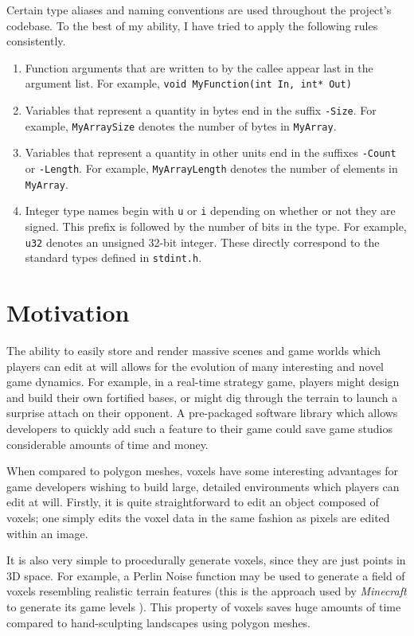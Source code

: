 Certain type aliases and naming conventions are used throughout the project's codebase. To the best of my ability, I have tried to apply the following rules consistently.
\begin{enumerate}
    \item Function arguments that are written to by the callee appear last in the  argument list. For example, \texttt{void MyFunction(int In, int* Out)}
    
    \item Variables that represent a quantity in bytes end in the suffix \texttt{-Size}. For example, \texttt{MyArraySize} denotes the number of bytes in \texttt{MyArray}.
    
    \item Variables that represent a quantity in other units end in the suffixes \texttt{-Count} or \texttt{-Length}. For example, \texttt{MyArrayLength} denotes the number of elements in \texttt{MyArray}.
    
    \item Integer type names begin with \texttt{u} or \texttt{i} depending on whether or not they are signed. This prefix is followed by the number of bits in the type. For example, \texttt{u32} denotes an unsigned 32-bit integer. These directly correspond to the standard types defined in \texttt{stdint.h}.
\end{enumerate}

\section{Motivation}
The ability to easily store and render massive scenes and game worlds which players can edit at will allows for the evolution of many interesting and novel game dynamics. For example, in a real-time strategy game, players might design and build their own fortified bases, or might dig through the terrain to launch a surprise attach on their opponent. A pre-packaged software library which allows developers to quickly add such a feature to their game could save game studios considerable amounts of time and money.

When compared to polygon meshes, voxels have some interesting advantages for game developers wishing to build large, detailed environments which players can edit at will. Firstly, it is quite straightforward to edit an object composed of voxels; one simply edits the voxel data in the same fashion as pixels are edited within an image.

It is also very simple to procedurally generate voxels, since they are just points in 3D space. For example, a Perlin Noise function may be used to generate a field of voxels resembling realistic terrain features (this is the approach used by \textit{Minecraft} to generate its game levels \autocite{fingas2015minecraft}). This property of voxels saves huge amounts of time compared to hand-sculpting landscapes using polygon meshes.

